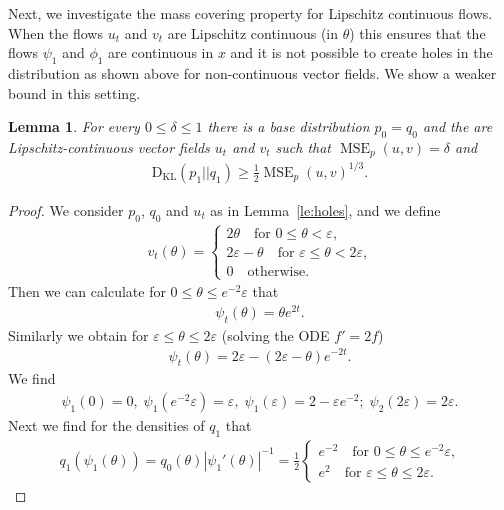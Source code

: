 \documentclass{article}
\newtheorem{lemma}{Lemma}
\theoremstyle{remark}
\newcommand{\eps}{\varepsilon}
\newcommand{\KL}{\mathrm{D_{KL}}}
\DeclareMathOperator{\MSE}{MSE}
\begin{document}
Next,  we investigate the mass covering property for Lipschitz continuous flows. When the flows $u_t$
and $v_t$ are Lipschitz continuous (in $\theta$) this ensures
that the flows $\psi_1$ and $\phi_1$ are continuous in $x$ and it is not possible to create holes in the distribution as shown above
for non-continuous vector fields.
We show a weaker bound in this setting.
\begin{lemma}\label{le:lipschitz}
      For every $0\leq  \delta \leq 1$ there is a base distribution  $p_0=q_0$ and the are  Lipschitz-continuous vector fields $u_t$
    and $v_t$ such that 
    $\MSE_p(u,v)=\delta$ and
    \begin{align}
        \KL(p_1||q_1)\geq  \frac12 \MSE_p(u,v)^{1/3}.
    \end{align}
\end{lemma}
\begin{proof}
We consider $p_0$, $q_0$ and $u_t$ as in Lemma~\ref{le:holes}, and we define
\begin{align}
    v_t(\theta) =
    \begin{cases}
        2\theta \quad \text{for $0\leq \theta< \eps$,}
        \\
        2\eps - \theta \quad \text{for $\eps\leq \theta< 2\eps$,}
        \\
        0 \quad \text{otherwise}.
    \end{cases}
\end{align}
Then we can calculate for 
$0\leq \theta \leq e^{-2}\eps$
that 
\begin{align}
    \psi_t(\theta)
    = \theta e^{2t}.
\end{align}
Similarly we obtain
for $\eps\leq \theta\leq 2\eps$
(solving the ODE $f'=2f$)
\begin{align}
    \psi_t(\theta)
    = 2\eps - (2\eps - \theta) e^{-2t}.
\end{align}
We find
\begin{align}\label{eq:Psi_evals}
   \psi_1(0)=0,\; \psi_1(e^{-2}\eps)=\eps, 
   \;
   \psi_1(\eps)=2-\eps e^{-2};
   \;
   \psi_2(2\eps)=2\eps.
\end{align}
Next we find for the densities of $q_1$ that 
\begin{align}
    q_1(\psi_1(\theta))
    =
    q_0(\theta) |\psi_1'(\theta)|^{-1}
    =\frac12
    \begin{cases}
    e^{-2} \quad \text{for $0\leq \theta \leq e^{-2}\eps$,}
    \\
    e^{2} \quad \text{for $\eps\leq \theta \leq 2\eps$.}
    \end{cases}

\end{align}
\end{proof}
\end{document}

